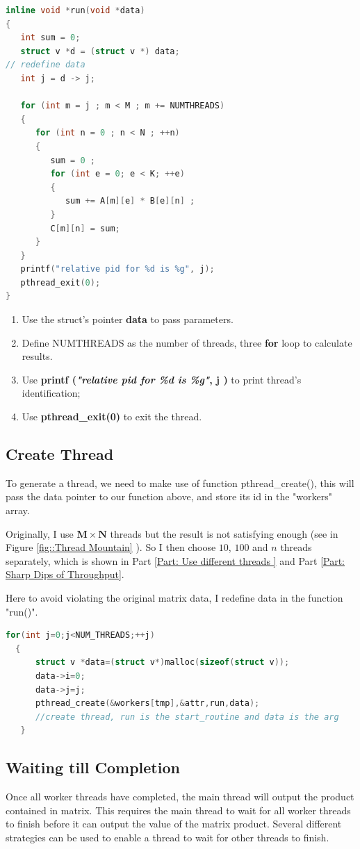 \documentclass[12pt,a4paper]{article}
\begin{document}
\begin{lstlisting}[language = C++]
inline void *run(void *data)
{
   int sum = 0;
   struct v *d = (struct v *) data;
// redefine data
   int j = d -> j;
   
   for (int m = j ; m < M ; m += NUMTHREADS) 
   {	
      for (int n = 0 ; n < N ; ++n)
      {
         sum = 0 ;
         for (int e = 0; e < K; ++e)
         {
            sum += A[m][e] * B[e][n] ;
         }
         C[m][n] = sum;
      }
   }
   printf("relative pid for %d is %g", j); 
   pthread_exit(0);   
}

\end{lstlisting}
\begin{enumerate}
	\item Use the struct's pointer {\bfseries*data} to pass parameters.
	\item Define NUMTHREADS as the number of threads, three {\bfseries{for}} loop to calculate results.
	\item Use {\bfseries printf ({\ttfamily\slshape "relative pid for \%d is \%g"}, {\bfseries j} )} to print thread's identification;
	\item Use {\bfseries pthread\_exit(0)} to exit the thread.
\end{enumerate}


\subsection{Create Thread}
To generate a thread, we need to make use of function pthread\_create(), this will pass the data pointer to our function above, and store its id in the "workers" array.

Originally, I use $\mathbf{M\times N}$ threads but the result is not satisfying enough (see in Figure \ref{fig::Thread Mountain} ). So I then choose $10$, $100$ and $n$ threads separately, which is shown in Part \ref{Part: Use different threads } and Part \ref{Part: Sharp Dips of Throughput}.

Here to avoid violating the original matrix data, I redefine data in the function "run()".
\begin{lstlisting}[language=C++]	
  for(int j=0;j<NUM_THREADS;++j)
  {
      struct v *data=(struct v*)malloc(sizeof(struct v));
      data->i=0;
      data->j=j;
      pthread_create(&workers[tmp],&attr,run,data);
      //create thread, run is the start_routine and data is the arg
   }
\end{lstlisting}
\subsection{Waiting till Completion}
Once all worker threads have completed, the main thread will output the product contained in
matrix. This requires the main thread to wait for all worker threads to finish before it can output
the value of the matrix product. Several different strategies can be used to enable a thread to wait for other threads to finish.
\end{document}
